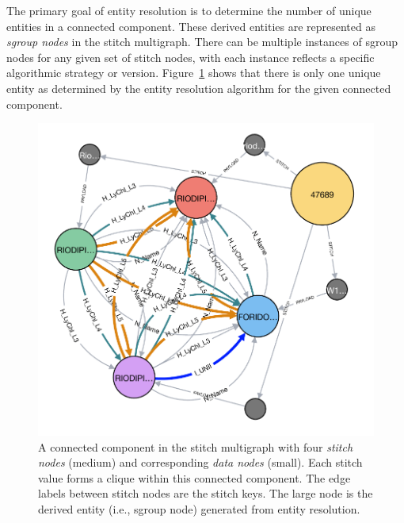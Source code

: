 \documentclass{bioinfo}
\begin{document}
The primary goal of entity resolution is to determine the number of unique entities in a connected component. These derived entities are represented as \emph{sgroup nodes} in the stitch multigraph. There can be multiple instances of sgroup nodes for any given set of stitch nodes, with each instance reflects a specific algorithmic strategy or version. Figure~\ref{fig:graph1} shows that there is only one unique entity as determined by the entity resolution algorithm for the given connected component.

\begin{figure}[!tpb]
\centerline{\includegraphics[scale=0.5]{graph3}}
\caption{A connected component in the stitch multigraph with four \emph{stitch nodes} (medium) and corresponding \emph{data nodes} (small). Each stitch value forms a clique within this connected component. The edge labels between stitch nodes are the stitch keys. The large node is the derived entity (i.e., sgroup node) generated from entity resolution.}\label{fig:graph1}
\end{figure}
\end{document}
